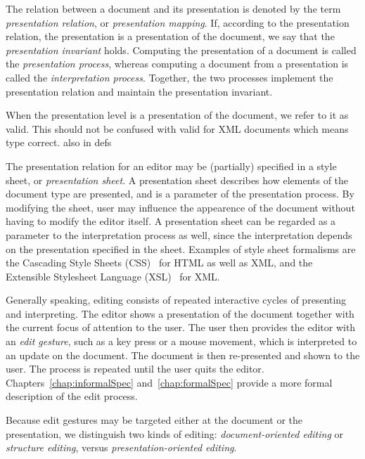 The relation between a document and its presentation is denoted by the term {\em presentation relation}, or {\em presentation mapping}. If, according to the presentation relation, the presentation is a presentation of the document, we say that the {\em presentation invariant} holds. Computing the presentation of a document is called the {\em presentation process}, whereas computing a document from a presentation is called the {\em interpretation process}. Together, the two processes implement the presentation relation and maintain the presentation invariant.

\bc
When the presentation level is a presentation of the document, we refer to it as valid. This should not be confused with valid for XML documents which means type correct.
also in defs
\ec

The presentation relation for an editor may be (partially) specified in a style sheet, or {\em presentation sheet}. A presentation sheet describes how elements of the document type are presented, and is a parameter of the presentation process. By modifying the sheet, user may influence the appearence of the document without having to modify the editor itself. A presentation sheet can be regarded as a parameter to the interpretation process as well, since the interpretation depends on the presentation specified in the sheet. Examples of style sheet formalisms are the Cascading Style Sheets (CSS)~\cite{css2} for HTML as well as XML, and the Extensible Stylesheet Language (XSL)~\cite{xsl10} for XML.

Generally speaking, editing consists of repeated interactive cycles of presenting and interpreting. The editor shows a presentation of the document together with the current focus of attention to the user. The user then provides the editor with an {\em edit gesture}, such as a key press or a mouse movement, which is interpreted to an update on the document. The document is then re-presented and shown to the user. The process is repeated until the user quits the editor. Chapters~\ref{chap:informalSpec} and~\ref{chap:formalSpec} provide a more formal description of the edit process.


Because edit gestures may be targeted either at the document or the presentation, we distinguish two kinds of editing:  {\em document-oriented editing} or {\em structure editing}, versus {\em presentation-oriented editing}.

